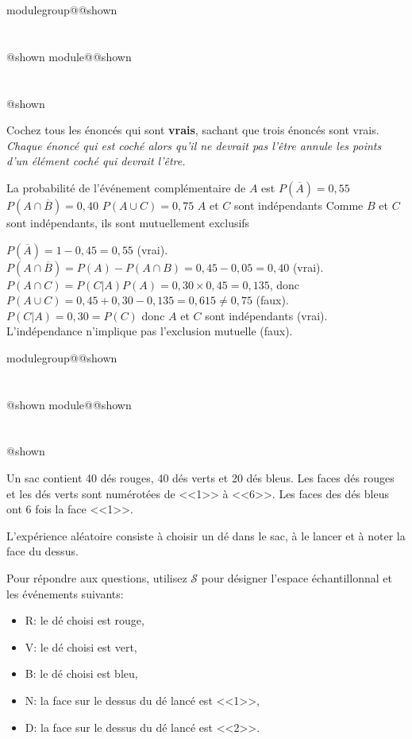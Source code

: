 \documentclass{Evaluation}
\makeatletter
\newcommand{\currentmodulekey}{}
\newcommand{\currentmoduletitle}{}
\newcommand{\currentgroupkey}{}
\newcommand{\currentgrouptitle}{}
\newcommand{\showmoduleifneeded}{%
  \ifx\currentgroupkey\empty\else
    \expandafter\ifx\csname modulegroup@\currentgroupkey @shown\endcsname\relax
      \section*{\currentgrouptitle}%
      \expandafter\gdef\csname modulegroup@\currentgroupkey @shown\endcsname{1}%
    \fi
  \fi
  \expandafter\ifx\csname module@\currentmodulekey @shown\endcsname\relax
    \section*{\currentmoduletitle}%
    \expandafter\gdef\csname module@\currentmodulekey @shown\endcsname{1}%
  \fi
}
\newenvironment{A25}{\showmoduleifneeded}{}
\newenvironment{H26}{\showmoduleifneeded}{}
\makeatother
\begin{document}
\begin{questions}
\begin{A25}
Cochez tous les énoncés qui sont \textbf{vrais}, sachant que trois énoncés sont vrais. \textit{Chaque énoncé qui est coché alors qu'il ne devrait pas l'être annule les points d'un élément coché qui devrait l'être.}
\begin{checkboxes}
\correctchoice La probabilité de l'événement complémentaire de \(A\) est $ P(\overline{A}) = 0,55 $
\correctchoice $ P(A \cap \overline{B}) = 0,40 $
\choice $ P(A \cup C) = 0,75 $
\correctchoice $A$ et $C$ sont indépendants
\choice Comme $B$ et $C$ sont indépendants, ils sont mutuellement exclusifs
\end{checkboxes}

\begin{solution}
    $P(\overline{A})=1-0,45=0,55$ (vrai). $P(A\cap\overline{B})=P(A)-P(A\cap B)=0,45-0,05=0,40$ (vrai). $P(A\cap C)=P(C|A)P(A)=0,30\times 0,45=0,135$, donc $P(A\cup C)=0,45+0,30-0,135=0,615\neq 0,75$ (faux). $P(C|A)=0,30=P(C)$ donc $A$ et $C$ sont indépendants (vrai). L'indépendance n'implique pas l'exclusion mutuelle (faux).
\end{solution}
\end{A25}

\begin{H26}
\question {} %
Un sac contient 40 dés rouges, 40 dés verts et 20 dés bleus.
Les faces dés rouges et les dés verts sont numérotées de <<1>> à <<6>>.
Les faces des dés bleus ont 6 fois la face <<1>>.

L'expérience aléatoire consiste à choisir un dé dans le sac, à le lancer et à noter la face du dessus.

Pour répondre aux questions, utilisez $\mathcal{S}$ pour désigner l'espace échantillonnal et les événements suivants:

\begin{itemize}
    \item R: le dé choisi est rouge,
    \item V: le dé choisi est vert,
    \item B: le dé choisi est bleu,
    \item N: la face sur le dessus du dé lancé est <<1>>,
    \item D: la face sur le dessus du dé lancé est <<2>>.
\end{itemize}

\end{H26}
\end{questions}
\end{document}
